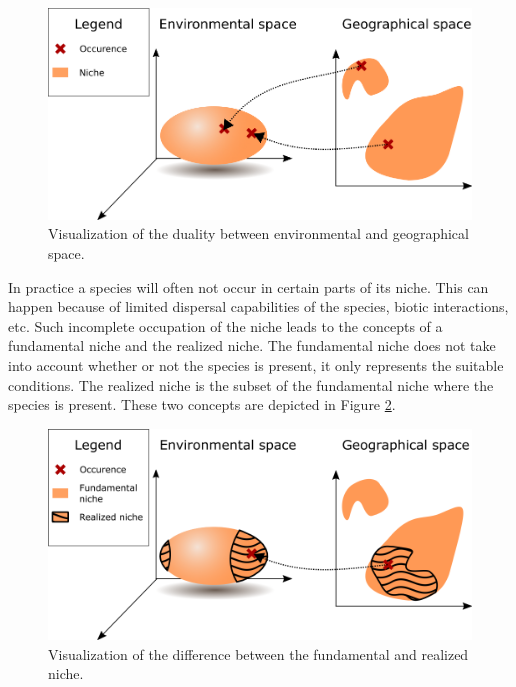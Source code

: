\begin{figure}[!htb]
\center
\includegraphics[scale=0.5]{VectorGraphics/Niche.png}
\caption{\label{fig:chTheEcologicalNicheConcept:Niche}Visualization of the duality between environmental and geographical space.}
\end{figure}

In practice a species will often not occur in certain parts of its niche. This can happen because of limited dispersal capabilities of the species, biotic interactions, etc. Such incomplete occupation of the niche leads to the concepts of a fundamental niche and the realized niche. The fundamental niche does not take into account whether or not the species is present, it only represents the suitable conditions. The realized niche is the subset of the fundamental niche where the species is present. These two concepts are depicted in Figure \ref{fig:chTheEcologicalNicheConcept:RealizedNiche}. 
\begin{figure}[!htb]
\center
\includegraphics[scale=0.5]{VectorGraphics/RealizedNiche.png}
\caption{\label{fig:chTheEcologicalNicheConcept:RealizedNiche}Visualization of the difference between the fundamental and realized niche.}
\end{figure}

